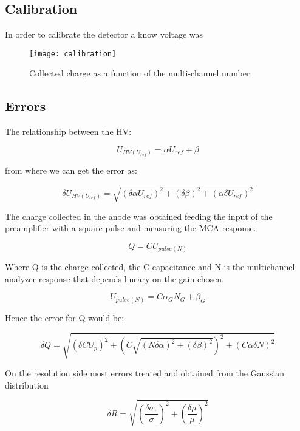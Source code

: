 \subsection{Calibration}
In order to calibrate the detector a know voltage was
\label{sec:calibration}
\begin{figure}[!h]
  \centering
  \texttt{[image: calibration]}
  \caption{Collected charge as a function of the multi-channel number}
  \label{fig:calibration}
\end{figure}
\subsection{Errors}


The relationship between the HV:

\begin{equation}
  U_{HV(U_{ref})} = \alpha U_{ref} + \beta
\end{equation}

from where we can get the error as:

\begin{equation}
  \delta U_{HV(U_{ref})} = \sqrt{ (\delta \alpha  U_{ref})^2 + (\delta \beta)^2 + (\alpha \delta U_{ref})^2 }
\end{equation}

The charge collected in the anode was obtained feeding the input of the preamplifier with a square pulse and measuring the MCA response.

\begin{equation}
  Q = C U_{pulse (N)} 
\end{equation}

Where Q is the charge collected, the C capacitance and N is the multichannel analyzer response that depends lineary on the gain chosen.

\begin{equation}
  U_{pulse (N)}= C\alpha_G N_G + \beta_G
\end{equation}

Hence the error for Q would be:

\begin{equation}
  \delta Q = \sqrt{(\delta CU_p )^2 + (C \sqrt{(N\delta \alpha)^2+(\delta \beta)^2} )^2 + (C\alpha \delta N)^2}
\end{equation}

On the resolution side most errors treated and obtained from the Gaussian distribution

\begin{equation}
  \delta R = \sqrt{(\frac{\delta \sigma,}{\sigma})^2 + (\frac{\delta \mu}{\mu})^2}
\end{equation}



